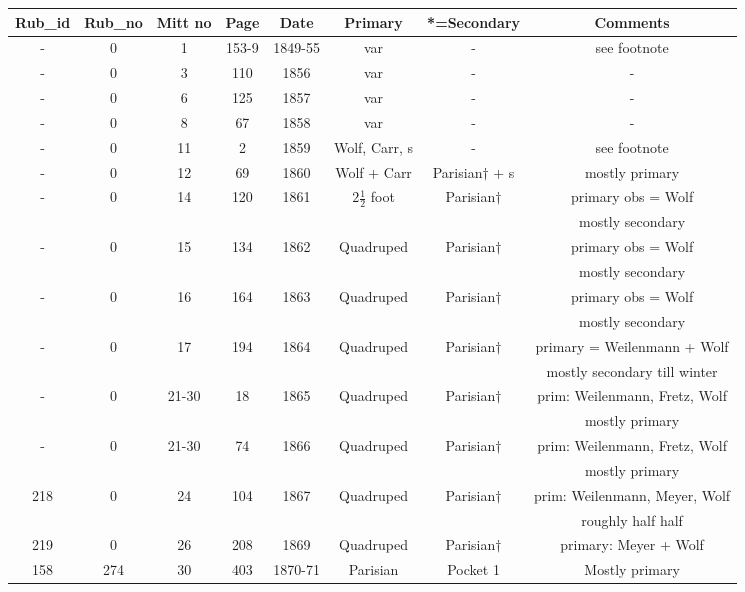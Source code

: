 \documentclass[12pt]{article}
\begin{document}
{\centering
    \begin{tabular}{c|c|c|c|c|c|c|c}
        Rub_{id} & Rub_{no} & Mitt no & Page & Date & Primary & *=Secondary& Comments \\
        \hline
        - & 0 & 1 & 153-9 & 1849-55 & var & - & see footnote \footnotemark[7] \\ 
        - & 0 & 3 & 110 & 1856 & var & - & - \\ 
        - & 0 & 6 & 125 & 1857 & var & - & - \\
        - & 0 & 8 & 67 & 1858 & var & - & - \\
        - & 0 & 11 & 2 & 1859 & Wolf, Carr, s & - & see footnote \footnotemark[6] \\
        - & 0 & 12 & 69 & 1860 & Wolf + Carr & Parisian$\dagger$ + s & mostly primary \footnotemark[5]  \\ 
        - & 0 & 14 & 120 & 1861 & $2\frac{1}{2}$ foot & Parisian$\dagger$ & primary obs = Wolf\\
        &&&&&&& mostly secondary\\
        - & 0 & 15 & 134 & 1862 & Quadruped & Parisian$\dagger$ & primary obs = Wolf\\
        &&&&&&& mostly secondary\\
        - & 0 & 16 & 164 & 1863 & Quadruped & Parisian$\dagger$ & primary obs = Wolf\\
        &&&&&&& mostly secondary\\
        - & 0 & 17 & 194 & 1864 & Quadruped & Parisian$\dagger$ & primary = Weilenmann + Wolf \\
        &&&&&&& mostly secondary till winter\\
        - & 0 & 21-30 & 18 & 1865 & Quadruped & Parisian$\dagger$ & prim: Weilenmann, Fretz, Wolf \\
        &&&&&&& mostly primary\\
        - & 0 & 21-30 & 74 & 1866 & Quadruped & Parisian$\dagger$ & prim: Weilenmann, Fretz, Wolf \\
        &&&&&&& mostly primary\\
        218 & 0 & 24 & 104 & 1867 & Quadruped & Parisian$\dagger$ & prim: Weilenmann, Meyer, Wolf \\
        &&&&&&& roughly half half\\
        219 & 0 & 26 & 208 & 1869 & Quadruped & Parisian$\dagger$ & primary: Meyer + Wolf\\
        158 & 274 & 30 & 403 & 1870-71 & Parisian & Pocket 1 & Mostly primary \\

\end{tabular}}
\end{document}
